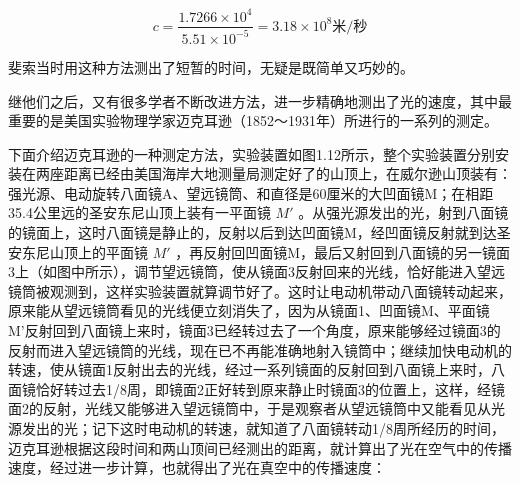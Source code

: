 \[
c = \frac {1.7266 \times 10 ^ {4}}{5.51 \times 10 ^ {- 5}} = 3.18 \times 10 ^ {8} \text{米/秒}
\]

斐索当时用这种方法测出了短暂的时间，无疑是既简单又巧妙的。

继他们之后，又有很多学者不断改进方法，进一步精确地测出了光的速度，其中最重要的是美国实验物理学家迈克耳逊（1852～1931年）所进行的一系列的测定。

下面介绍迈克耳逊的一种测定方法，实验装置如图1.12所示，整个实验装置分别安装在两座距离已经由美国海岸大地测量局测定好了的山顶上，在威尔逊山顶装有：强光源、电动旋转八面镜A、望远镜筒、和直径是60厘米的大凹面镜M；在相距35.4公里远的圣安东尼山顶上装有一平面镜
\(M'\)
。从强光源发出的光，射到八面镜的镜面上，这时八面镜是静止的，反射以后到达凹面镜M，经凹面镜反射就到达圣安东尼山顶上的平面镜
\(M'\)
，再反射回凹面镜M，最后又射回到八面镜的另一镜面3上（如图中所示），调节望远镜筒，使从镜面3反射回来的光线，恰好能进入望远镜筒被观测到，这样实验装置就算调节好了。这时让电动机带动八面镜转动起来，原来能从望远镜筒看见的光线便立刻消失了，因为从镜面1、凹面镜M、平面镜M'反射回到八面镜上来时，镜面3已经转过去了一个角度，原来能够经过镜面3的反射而进入望远镜筒的光线，现在已不再能准确地射入镜筒中；继续加快电动机的转速，使从镜面1反射出去的光线，经过一系列镜面的反射回到八面镜上来时，八面镜恰好转过去1/8周，即镜面2正好转到原来静止时镜面3的位置上，这样，经镜面2的反射，光线又能够进入望远镜筒中，于是观察者从望远镜筒中又能看见从光源发出的光；记下这时电动机的转速，就知道了八面镜转动1/8周所经历的时间，迈克耳逊根据这段时间和两山顶间已经测出的距离，就计算出了光在空气中的传播速度，经过进一步计算，也就得出了光在真空中的传播速度：

